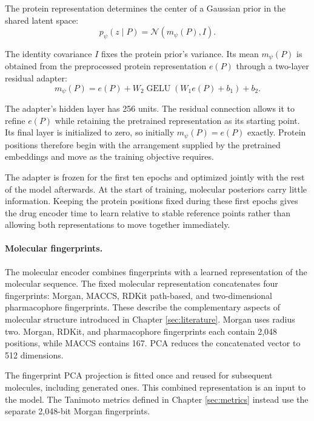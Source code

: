 \documentclass[a4paper,12pt]{article}
\newcommand{\Ncal}{\mathcal{N}}
\begin{document}
The protein representation determines the center of a Gaussian prior in the shared latent space:
\begin{equation*}
    p_\psi(z\mid P)
    =
    \Ncal\!\left(
    m_\psi(P),
    I
    \right).
\end{equation*}

The identity covariance $I$ fixes the protein prior's variance. Its mean $m_\psi(P)$ is obtained from the preprocessed protein representation $e(P)$ through a two-layer residual adapter:
\begin{equation*}
    m_\psi(P)
    =
    e(P)
    +
    W_2
    \operatorname{GELU}
    \left(
    W_1 e(P)+b_1
    \right)
    +b_2.
\end{equation*}

The adapter's hidden layer has 256 units. The residual connection allows it to refine $e(P)$ while retaining the pretrained representation as its starting point. Its final layer is initialized to zero, so initially $m_\psi(P)=e(P)$ exactly. Protein positions therefore begin with the arrangement supplied by the pretrained embeddings and move as the training objective requires.

The adapter is frozen for the first ten epochs and optimized jointly with the rest of the model afterwards. At the start of training, molecular posteriors carry little information. Keeping the protein positions fixed during these first epochs gives the drug encoder time to learn relative to stable reference points rather than allowing both representations to move together immediately.

\paragraph{Molecular fingerprints.}

The molecular encoder combines fingerprints with a learned representation of the molecular sequence. The fixed molecular representation concatenates four fingerprints: Morgan, MACCS, RDKit path-based, and two-dimensional pharmacophore fingerprints. These describe the complementary aspects of molecular structure introduced in Chapter \ref{sec:literature}. Morgan uses radius two. Morgan, RDKit, and pharmacophore fingerprints each contain 2,048 positions, while MACCS contains 167. PCA reduces the concatenated vector to 512 dimensions.

The fingerprint PCA projection is fitted once and reused for subsequent molecules, including generated ones. This combined representation is an input to the model. The Tanimoto metrics defined in Chapter \ref{sec:metrics} instead use the separate 2,048-bit Morgan fingerprints.
\end{document}
